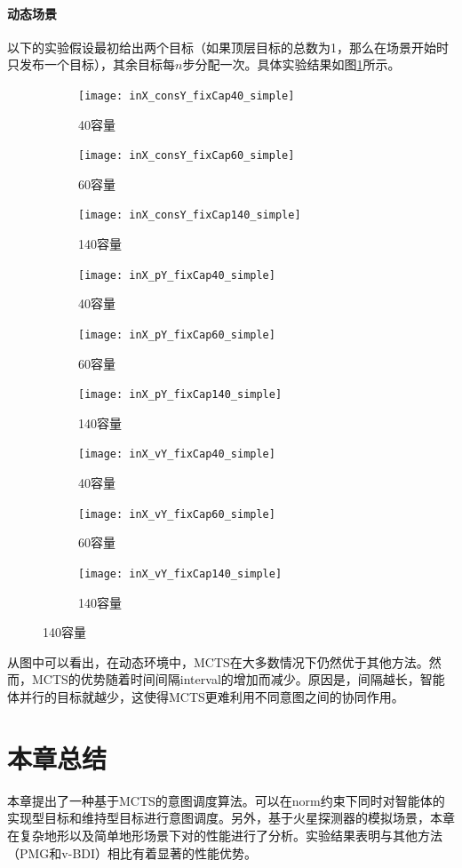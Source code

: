 \paragraph{动态场景}
以下的实验假设最初给出两个目标（如果顶层目标的总数为1，那么在场景开始时只发布一个目标），其余目标每$n$步分配一次。具体实验结果如图\ref{fig:dynamic_simple}所示。

\begin{figure}[H]
\centering
\begin{subfigure}{.32\textwidth}
  \centering
  \texttt{[image: inX\_consY\_fixCap40\_simple]}
  \caption{40容量}
  \captionsetup{justification=centering}
\end{subfigure}
\begin{subfigure}{.32\textwidth}
  \centering
  \texttt{[image: inX\_consY\_fixCap60\_simple]}
  \caption{60容量}
  \captionsetup{justification=centering}
\end{subfigure}
\begin{subfigure}{.32\textwidth}
  \centering
  \texttt{[image: inX\_consY\_fixCap140\_simple]}
  \caption{140容量}
  \captionsetup{justification=centering}
\end{subfigure}
\begin{subfigure}{.32\textwidth}
  \centering
  \texttt{[image: inX\_pY\_fixCap40\_simple]}
  \caption{40容量}
  \captionsetup{justification=centering}
\end{subfigure}
\begin{subfigure}{.32\textwidth}
  \centering
  \texttt{[image: inX\_pY\_fixCap60\_simple]}
  \caption{60容量}
  \captionsetup{justification=centering}
\end{subfigure}
\begin{subfigure}{.32\textwidth}
  \centering
  \texttt{[image: inX\_pY\_fixCap140\_simple]}
  \caption{140容量}
  \captionsetup{justification=centering}
\end{subfigure}
\begin{subfigure}{.32\textwidth}
  \centering
  \texttt{[image: inX\_vY\_fixCap40\_simple]}
  \caption{40容量}
  \captionsetup{justification=centering}
\end{subfigure}
\begin{subfigure}{.32\textwidth}
  \centering
  \texttt{[image: inX\_vY\_fixCap60\_simple]}
  \caption{60容量}
  \captionsetup{justification=centering}
\end{subfigure}
\begin{subfigure}{.32\textwidth}
  \centering
  \texttt{[image: inX\_vY\_fixCap140\_simple]}
  \caption{140容量}
  \captionsetup{justification=centering}
\end{subfigure}
\captionsetup{justification=centering}
\label{fig:dynamic_simple}
\end{figure}
从图中可以看出，在动态环境中，MCTS在大多数情况下仍然优于其他方法。然而，MCTS的优势随着时间间隔interval的增加而减少。原因是，间隔越长，智能体并行的目标就越少，这使得MCTS更难利用不同意图之间的协同作用。

\section{本章总结}
本章提出了一种基于MCTS的意图调度算法\SAT 。\SAT 可以在norm约束下同时对智能体的实现型目标和维持型目标进行意图调度。另外，基于火星探测器的模拟场景，本章在复杂地形以及简单地形场景下对\SAT 的性能进行了分析。实验结果表明\SAT 与其他方法（PMG和v-BDI）相比有着显著的性能优势。
